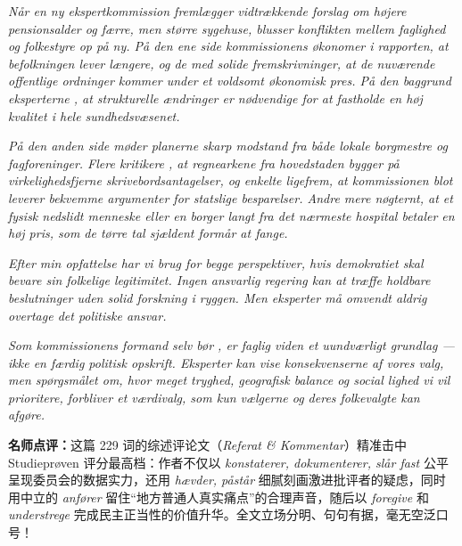 \begin{answerbox}
\textit{Når en ny ekspertkommission fremlægger vidtrækkende forslag om højere pensionsalder og færre, men større sygehuse, blusser konflikten mellem faglighed og folkestyre op på ny. På den ene side  kommissionens økonomer i rapporten, at befolkningen lever længere, og de  med solide fremskrivninger, at de nuværende offentlige ordninger kommer under et voldsomt økonomisk pres. På den baggrund  eksperterne , at strukturelle ændringer er nødvendige for at fastholde en høj kvalitet i hele sundhedsvæsenet.}

\textit{På den anden side møder planerne skarp modstand fra både lokale borgmestre og fagforeninger. Flere kritikere , at regnearkene fra hovedstaden bygger på virkelighedsfjerne skrivebordsantagelser, og enkelte  ligefrem, at kommissionen blot leverer bekvemme argumenter for statslige besparelser. Andre  mere nøgternt, at et fysisk nedslidt menneske eller en borger langt fra det nærmeste hospital betaler en høj pris, som de tørre tal sjældent formår at fange.}

\textit{Efter min opfattelse har vi brug for begge perspektiver, hvis demokratiet skal bevare sin folkelige legitimitet. Ingen ansvarlig regering kan  at træffe holdbare beslutninger uden solid forskning i ryggen. Men eksperter må omvendt aldrig overtage det politiske ansvar.}

\textit{Som kommissionens formand selv bør , er faglig viden et uundværligt grundlag --- ikke en færdig politisk opskrift. Eksperter kan vise konsekvenserne af vores valg, men spørgsmålet om, hvor meget tryghed, geografisk balance og social lighed vi vil prioritere, forbliver et værdivalg, som kun vælgerne og deres folkevalgte kan afgøre.}

\small\textbf{名师点评：}这篇 229 词的综述评论文（\textit{Referat \& Kommentar}）精准击中 Studieprøven 评分最高档：作者不仅以 \textit{konstaterer, dokumenterer, slår fast} 公平呈现委员会的数据实力，还用 \textit{hævder, påstår} 细腻刻画激进批评者的疑虑，同时用中立的 \textit{anfører} 留住“地方普通人真实痛点”的合理声音，随后以 \textit{foregive} 和 \textit{understrege} 完成民主正当性的价值升华。全文立场分明、句句有据，毫无空泛口号！
\end{answerbox}
